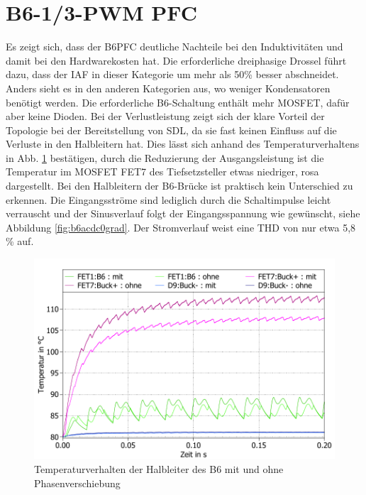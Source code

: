 \section{B6-1/3-PWM PFC}
Es zeigt sich, dass der \gls{B6PFC} deutliche Nachteile bei den Induktivitäten und damit bei den Hardwarekosten hat. Die erforderliche dreiphasige Drossel führt dazu, dass der IAF in dieser Kategorie um mehr als 50\% besser abschneidet.
Anders sieht es in den anderen Kategorien aus, wo weniger Kondensatoren benötigt werden. Die erforderliche B6-Schaltung enthält mehr \gls{MOSFET}, dafür aber keine Dioden. Bei der Verlustleistung zeigt sich der klare Vorteil der Topologie bei der Bereitstellung von \gls{SDL}, da sie fast keinen Einfluss auf die Verluste in den Halbleitern hat. Dies lässt sich anhand des Temperaturverhaltens in Abb. \ref{fig:b6temp030grad} bestätigen, durch die Reduzierung der Ausgangsleistung ist die Temperatur im \gls{MOSFET} FET7 des Tiefsetzsteller etwas niedriger, rosa dargestellt. Bei den Halbleitern der B6-Brücke ist praktisch kein Unterschied zu erkennen. Die Eingangsströme sind lediglich durch die Schaltimpulse leicht verrauscht und der Sinusverlauf folgt der Eingangsspannung wie gewünscht, siehe Abbildung \ref{fig:b6acdc0grad}.  Der Stromverlauf weist eine THD von nur etwa 5,8 \% auf.
\begin{figure}
	\centering
	\includegraphics[width=1\linewidth]{content/Grafiken/B6_Temp_0&30Grad}
	\caption{Temperaturverhalten der Halbleiter des B6 mit und ohne Phasenverschiebung}
	\label{fig:b6temp030grad}
\end{figure}


